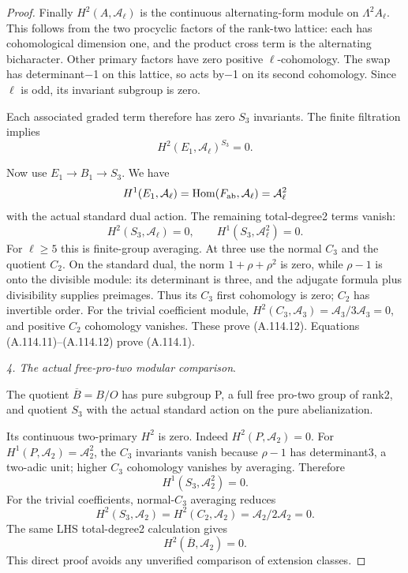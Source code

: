 \begin{proof}
Finally \(H^2(A,\mathcal A_\ell)\) is the continuous alternating-form module on \(\Lambda^2 A_\ell\). This follows from the two procyclic factors of the rank-two lattice: each has cohomological dimension one, and the product cross term is the alternating bicharacter. Other primary factors have zero positive \(\ell\)-cohomology. The swap has determinant\(-\)1 on this lattice, so acts by\(-\)1 on its second cohomology. Since \(\ell\) is odd, its invariant subgroup is zero.

Each associated graded term therefore has zero \(S_3\) invariants. The finite filtration implies
\[
H^2(E_1,\mathcal A_\ell)^{S_3}=0.                             \tag{A.114.11}
\]

Now use \(E_1\to B_1\to S_3\). We have
\[
H^1(E_1,\mathcal A_\ell)=
\operatorname{Hom}(F_{\rm ab},\mathcal A_\ell)
=\mathcal A_\ell^2
\]
with the actual standard dual action. The remaining total-degree2 terms vanish:
\[
H^2(S_3,\mathcal A_\ell)=0,\qquad
H^1(S_3,\mathcal A_\ell^2)=0.                                 \tag{A.114.12}
\]
For \(\ell\ge5\) this is finite-group averaging. At three use the normal \(C_3\) and the quotient \(C_2\). On the standard dual, the norm \(1+\rho+\rho^2\) is zero, while \(\rho-1\) is onto the divisible module: its determinant is three, and the adjugate formula plus divisibility supplies preimages. Thus its \(C_3\) first cohomology is zero; \(C_2\) has invertible order. For the trivial coefficient module, \(H^2(C_3,\mathcal A_3)=\mathcal A_3/3\mathcal A_3=0\), and positive \(C_2\) cohomology vanishes. These prove (A.114.12). Equations (A.114.11)--(A.114.12) prove (A.114.1).

\medskip\noindent\emph{4. The actual free-pro-two modular comparison}.

The quotient \(\overline B=B/O\) has pure subgroup P, a full free pro-two group of rank2, and quotient \(S_3\) with the actual standard action on the pure abelianization.

Its continuous two-primary \(H^2\) is zero. Indeed \(H^2(P,\mathcal A_2)=0\). For \(H^1(P,\mathcal A_2)=\mathcal A_2^2\), the \(C_3\) invariants vanish because \(\rho-1\) has determinant3, a two-adic unit; higher \(C_3\) cohomology vanishes by averaging. Therefore
\[
H^1(S_3,\mathcal A_2^2)=0.
\]
For the trivial coefficients, normal-\(C_3\) averaging reduces
\[
H^2(S_3,\mathcal A_2)=H^2(C_2,\mathcal A_2)
=\mathcal A_2/2\mathcal A_2=0.
\]
The same LHS total-degree2 calculation gives
\[
H^2(\overline B,\mathcal A_2)=0.                              \tag{A.114.13}
\]
This direct proof avoids any unverified comparison of extension classes.


\end{proof}
